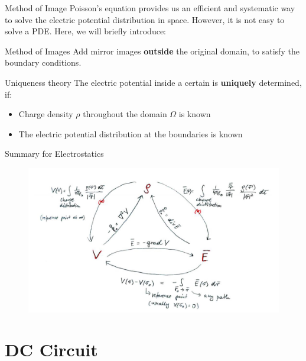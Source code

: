 \documentclass{beamer}
\begin{document}
\begin{frame}{Method of Image}
    Poisson's equation provides us an efficient and systematic way to solve the electric potential distribution in space.
    However, it is not easy to solve a PDE. Here, we will briefly introduce:
    \vspace{.5em}
    
    \begin{beamerboxesrounded}[shadow=true]{Method of Images}
        Add mirror images \textbf{outside} the original domain, to satisfy the boundary conditions.
    \end{beamerboxesrounded}
    \begin{block}{Uniqueness theory}
        The electric potential inside a certain is \textbf{uniquely} determined, if:
        \begin{itemize}
            \item Charge density $\rho$ throughout the domain $\Omega$ is known
            \item The electric potential distribution at the boundaries is known
        \end{itemize}
    \end{block}
\end{frame}

\begin{frame}{Summary for Electrostatics}
    \begin{figure}[htbp]
        \centering
        \includegraphics[width=\textwidth]{images/elec.jpg}
    \end{figure}
\end{frame}


\section{DC Circuit}
\end{document}
